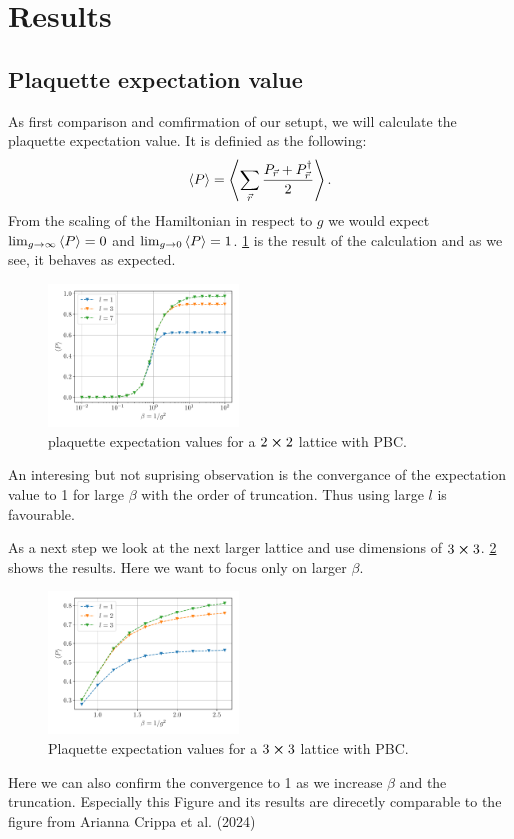 \section{Results}
\subsection{Plaquette expectation value}
As first comparison and comfirmation of our setupt, we will calculate the plaquette expectation value. It is definied as the following:
\begin{align}
	\Braket{P} = \Braket{\sum_{\vec{r}}\frac{P_{\vec{r}}+P_{\vec{r}}^{\dag}}{2}}.
\end{align}
From the scaling of the Hamiltonian in respect to $g$ we would expect $\lim_{g\rightarrow\infty}\Braket{P}=0$ and $\lim_{g\rightarrow0}\Braket{P}=1$. \cref{fig:2exp} is the result of the calculation and as we see, it behaves as expected. %
\begin{figure}[h]
	\begin{center}
		\includegraphics[width=0.45\textwidth]{images/PlaquetteExp2x2PBC.pdf}
	\end{center}
	\caption{plaquette expectation values for a $2\cross2$ lattice with PBC.}\label{fig:2exp}
\end{figure}
An interesing but not suprising observation is the convergance of the expectation value to 1 for large $\beta$ with the order of truncation. Thus using large $l$ is favourable.

As a next step we look at the next larger lattice and use dimensions of $3\cross3$. \cref{fig:3exp} shows the results. Here we want to focus only on larger $\beta$.
\begin{figure}[h]
	\begin{center}
		\includegraphics[width=0.45\textwidth]{images/PlaquetteExp3x3PBC.pdf}
	\end{center}
	\caption{Plaquette expectation values for a $3\cross3$ lattice with PBC.}\label{fig:3exp}
\end{figure}
\newpage
Here we can also confirm the convergence to 1 as we increase $\beta$ and the truncation. Especially this Figure and its results are direcetly comparable to the figure from Arianna Crippa et al. (2024)\cite{crippa2024}


